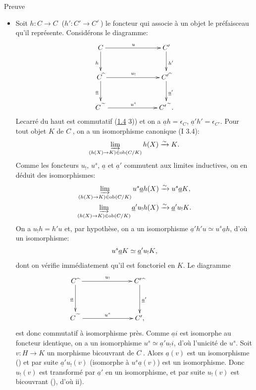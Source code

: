 \documentclass[10pt]{../fichiers-configuration-latex/smfart}
\begin{document}
\begin{enonce*}[remark]{Preuve}
\begin{itemize}
\item[iv) $\Rightarrow$ ii):] Soit $h:C\rightarrow
  C^{\widehat{\phantom{,}}}$ (\resp $h':C'\rightarrow
  {C'}^{\widehat{\phantom{,}}}$) le foncteur qui associe à un objet
  le préfaisceau qu'il représente. Considérons le diagramme:
\[
\xymatrix@C=2.5cm@R=1cm{
C \ar[r]^{u}\ar[d]_{h}             &   C' \ar[d]^{h'}\\
C{\widehat{\phantom{i}}} \ar[d]_{\underline{a}} \ar[r]^{u_!}&
C'{\widehat{\phantom{i}}} \ar[d]^{\underline{a}'}\\
C{\widetilde{\phantom{A}}} \ar[r]^{u^{s}}&
C'{\widetilde{\phantom{A}}}. }
\]
Le\pageoriginale carré du haut est commutatif (\hyperref[III.rem1.4]{1.4}
3)) et on a $\underline{a}h=\epsilon_C$, $\underline{a}'h'=\epsilon_{C'}$.
Pour tout objet $K$ de $C^{\widehat{\phantom{,}}}$, on a un
isomorphisme canonique (I 3.4):
$$
\varinjlim_{(h(X)\rightarrow K)\in \operatorname{ob} (C/K)} h(X)\xrightarrow{\sim}
K{}.
$$
Comme les foncteurs $u_{!}$, $u^s$, $\underline{a}$ et $\underline{a}'$
commutent aux limites inductives, on en déduit des
isomorphismes:
\begin{gather*}
\varinjlim_{(h(X)\rightarrow K)\in \operatorname{ob} (C/K)}
u^s\underline{a}h(X)\xrightarrow{\sim} u^s \underline{a}K{},\\
\varinjlim_{(h(X)\rightarrow K)\in \operatorname{ob} (C/K)}
\underline{a}'u_{!}h(X)\xrightarrow{\sim} \underline{a}'u_{!}K{}.
\end{gather*}
On a $u_{!}h=h'u$ et, par hypothèse, on a un isomorphisme
$\underline{a}'h'u\simeq u^s \underline{a}h$, d'où un isomorphisme:
$$
u^s\underline{a}K\simeq \underline{a}'u_{!}K{},
$$
dont on vérifie immédiatement qu'il est fonctoriel en $K$.
Le diagramme
\[
\xymatrix@C=2.5cm@R=1.35cm{
C\widehat{\phantom{a}} \ar[r]^{u_!} \ar[d]_{\underline{a}}&  C'\widehat{\phantom{a}}\ar[d]^{\underline{a}'}\\
C \widetilde{\phantom{A}} \ar[r]^{u^{s}}&  C',& }
\]
est donc commutatif à isomorphisme près. Comme $\underline{a}i$ est
isomorphe au foncteur identique, on a un isomorphisme $u^s\simeq
\underline{a}'u_{!}i$, d'où l'unicité de $u^s$. Soit $v:H\rightarrow
K$ un morphisme bicouvrant de $C^{\widehat{\phantom{,}}}$. Alors
$\underline{a}(v)$ est un isomorphisme () et par suite
$\underline{a}'u_{!}(v)$ (isomorphe à $u^s\underline{a}(v)$) est un
isomorphisme. Donc $u_{!}(v)$ est transformé par $\underline{a}'$ en un
isomorphisme, et par suite $u_{!}(v)$ est bicouvrant
(), d'où ii).
\end{itemize}
\end{enonce*}
\end{document}
